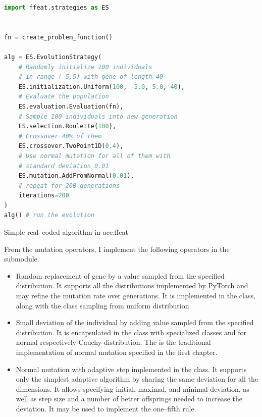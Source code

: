 \begin{algorithm}[b!]
\begin{lstlisting}[language=Python, xrightmargin=18pt]
import ffeat.strategies as ES


fn = create_problem_function()

alg = ES.EvolutionStrategy(
    # Randomly initialize 100 individuals 
    # in range (-5,5) with gene of length 40
    ES.initialization.Uniform(100, -5.0, 5.0, 40),
    # Evaluate the population
    ES.evaluation.Evaluation(fn),
    # Sample 100 individuals into new generation
    ES.selection.Roulette(100),
    # Crossover 40% of them
    ES.crossover.TwoPoint1D(0.4),
    # Use normal mutation for all of them with 
    # standard deviation 0.01
    ES.mutation.AddFromNormal(0.01),
    # repeat for 200 generations
    iterations=200
)
alg() # run the evolution
\end{lstlisting}
\caption{Simple real--coded algorithm in \acrshort*{acc:ffeat}}
\label{alg:esffeat}
\end{algorithm}

From the mutation operators, I implement the following operators in the  submodule.
\begin{itemize}
    \item Random replacement of gene by a value sampled from the specified distribution. It supports all the distributions implemented by PyTorch \citep{PyTorchDoc} and may refine the mutation rate over generations. It is implemented in the  class, along with the  class sampling from uniform distribution.
    \item Small deviation of the individual by adding value sampled from the specified distribution. It is encapsulated in the  class with specialized classes  and  for normal respectively Cauchy distribution. The  is the traditional implementation of normal mutation specified in the first chapter.
    \item Normal mutation with adaptive step implemented in the  class. It supports only the simplest adaptive algorithm by sharing the same deviation for all the dimensions. It allows specifying initial, maximal, and minimal deviation, as well as step size and a number of better offsprings needed to increase the deviation. It may be used to implement the one--fifth rule.
\end{itemize}

